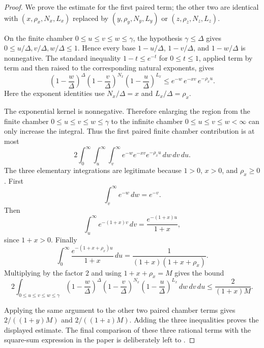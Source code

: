 \begin{proof}
We prove the estimate for the first paired term; the other two are identical
with $(x,\rho_x,N_x,L_x)$ replaced by $(y,\rho_y,N_y,L_y)$ or
$(z,\rho_z,N_z,L_z)$.

On the finite chamber $0\le u\le v\le w\le\gamma$, the hypothesis
$\gamma\le\Delta$ gives $0\le u/\Delta,v/\Delta,w/\Delta\le1$.  Hence every
base $1-u/\Delta$, $1-v/\Delta$, and $1-w/\Delta$ is nonnegative.  The
standard inequality $1-t\le e^{-t}$ for $0\le t\le1$, applied term by term
and then raised to the corresponding natural exponents, gives
\[
\left(1-\frac w\Delta\right)^\Delta
\left(1-\frac v\Delta\right)^{N_x}
\left(1-\frac u\Delta\right)^{L_x}
\le
e^{-w}\,e^{-xv}\,e^{-\rho_x u}.
\]
Here the exponent identities use
$N_x/\Delta=x$ and $L_x/\Delta=\rho_x$.

The exponential kernel is nonnegative.  Therefore enlarging the region from
the finite chamber $0\le u\le v\le w\le\gamma$ to the infinite chamber
$0\le u\le v\le w<\infty$ can only increase the integral.  Thus the first
paired finite chamber contribution is at most
\[
2\int_0^\infty\int_u^\infty\int_v^\infty
e^{-w}e^{-xv}e^{-\rho_xu}\,dw\,dv\,du .
\]
The three elementary integrations are legitimate because
$1>0$, $x>0$, and $\rho_x\ge0$.  First
\[
\int_v^\infty e^{-w}\,dw=e^{-v}.
\]
Then
\[
\int_u^\infty e^{-(1+x)v}\,dv
=\frac{e^{-(1+x)u}}{1+x},
\]
since $1+x>0$.  Finally
\[
\int_0^\infty \frac{e^{-(1+x+\rho_x)u}}{1+x}\,du
=\frac{1}{(1+x)(1+x+\rho_x)}.
\]
Multiplying by the factor $2$ and using $1+x+\rho_x=M$ gives the bound
\[
2\int_{0\le u\le v\le w\le\gamma}
\left(1-\frac w\Delta\right)^\Delta
\left(1-\frac v\Delta\right)^{N_x}
\left(1-\frac u\Delta\right)^{L_x}\,dw\,dv\,du
\le \frac{2}{(1+x)M}.
\]

Applying the same argument to the other two paired chamber terms gives
$2/((1+y)M)$ and $2/((1+z)M)$.  Adding the three inequalities proves the
displayed estimate.  The final comparison of these three rational terms with
the square-sum expression in the paper is deliberately left to
.
\end{proof}
